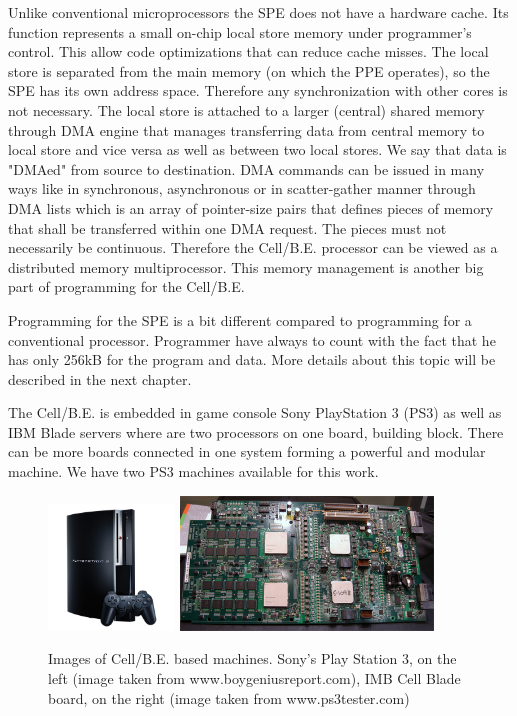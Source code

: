 \par
Unlike conventional microprocessors the SPE does not have a hardware cache.
Its function represents a small on-chip local store memory under programmer's control.
This allow code optimizations that can reduce cache misses.
The local store is separated from the main memory (on which the PPE operates), so the SPE has its own address space.
Therefore any synchronization with other cores is not necessary.
The local store is attached to a larger (central) shared memory through DMA engine that manages transferring data from central memory to local store and vice versa as well as between two local stores.
We say that data is "DMAed" from source to destination.
DMA commands can be issued in many ways like in synchronous, asynchronous or in scatter-gather manner through DMA lists which is an array of pointer-size pairs that defines pieces of memory that shall be transferred within one DMA request.
The pieces must not necessarily be continuous.
Therefore the Cell/B.E. processor can be viewed as a distributed memory multiprocessor.
This memory management is another big part of programming for the Cell/B.E.

\par
Programming for the SPE is a bit different compared to programming for a conventional processor.
Programmer have always to count with the fact that he has only 256kB for the program and data.
More details about this topic will be described in the next chapter.

\par
The Cell/B.E. is embedded in game console Sony PlayStation 3 (PS3) as well as IBM Blade servers where are two processors on one board, building block.
There can be more boards connected in one system forming a powerful and modular machine.
We have two PS3 machines available for this work.

\begin{figure}
    \centering
    \includegraphics[width=0.3\textwidth]{data/png/PS3}
    \includegraphics[width=0.6\textwidth]{data/png/ibm-cell-board}
    \caption[Cell/B.E. based machines]{Images of Cell/B.E. based machines.
Sony's Play Station 3, on the left (image taken from www.boygeniusreport.com), IMB Cell Blade board, on the right (image taken from www.ps3tester.com)
}
    \label{fg:cellmachines}
\end{figure}


